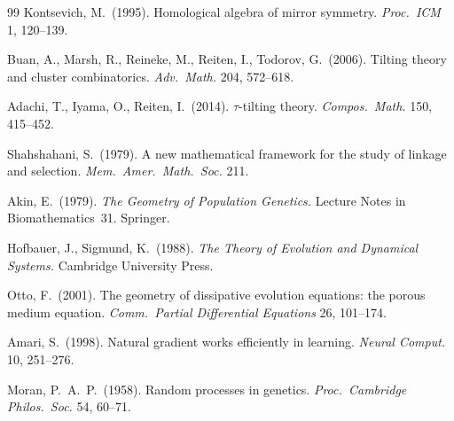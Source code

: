 \documentclass[11pt]{amsart}
\begin{document}
\begin{thebibliography}{99}
Kontsevich, M.\ (1995).
Homological algebra of mirror symmetry.
\emph{Proc.\ ICM} 1, 120--139.

Buan, A., Marsh, R., Reineke, M., Reiten, I., Todorov, G.\ (2006).
Tilting theory and cluster combinatorics.
\emph{Adv.\ Math.} 204, 572--618.

Adachi, T., Iyama, O., Reiten, I.\ (2014).
$\tau$-tilting theory.
\emph{Compos.\ Math.} 150, 415--452.

Shahshahani, S.\ (1979).
A new mathematical framework for the study of linkage and selection.
\emph{Mem.\ Amer.\ Math.\ Soc.} 211.

Akin, E.\ (1979).
\emph{The Geometry of Population Genetics.}
Lecture Notes in Biomathematics~31. Springer.

Hofbauer, J., Sigmund, K.\ (1988).
\emph{The Theory of Evolution and Dynamical Systems.}
Cambridge University Press.

Otto, F.\ (2001).
The geometry of dissipative evolution equations: the porous medium equation.
\emph{Comm.\ Partial Differential Equations} 26, 101--174.

Amari, S.\ (1998).
Natural gradient works efficiently in learning.
\emph{Neural Comput.} 10, 251--276.

Moran, P.\ A.\ P.\ (1958).
Random processes in genetics.
\emph{Proc.\ Cambridge Philos.\ Soc.} 54, 60--71.

\end{thebibliography}
\end{document}

